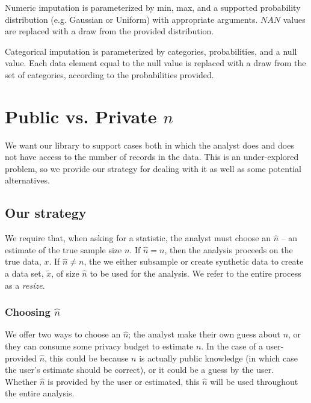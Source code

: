 \documentclass[11pt]{scrartcl} %
\begin{document}
Numeric imputation is parameterized by min, max, and a supported probability distribution (e.g. Gaussian or Uniform)
with appropriate arguments. $NAN$ values are replaced with a draw from the provided distribution. \newline

Categorical imputation is parameterized by categories, probabilities, and a null value.
Each data element equal to the null value is replaced with a draw from the set of categories,
according to the probabilities provided.

\section{Public vs. Private $n$}
We want our library to support cases both in which the analyst does and does not have access to
the number of records in the data. This is an under-explored problem, so we provide
our strategy for dealing with it as well as some potential alternatives.

\subsection{Our strategy}
We require that, when asking for a statistic, the analyst must choose an $\hat{n}$ -- an estimate
of the true sample size $n$. If $\hat{n} = n$, then the analysis proceeds on the
true data, $x$. If $\hat{n} \neq n$, the we either subsample or create synthetic data
to create a data set, $\tilde{x}$, of size $\hat{n}$ to be used for the analysis.
We refer to the entire process as a \emph{resize}.

\subsubsection{Choosing $\hat{n}$}
We offer two ways to choose an $\hat{n}$; the analyst make their own guess about $n$, or they can
consume some privacy budget to estimate $n$. In the case of a user-provided $\hat{n}$, this could be because
$n$ is actually public knowledge (in which case the user's estimate should be correct), or it could be
a guess by the user. Whether $\hat{n}$ is provided by the user or estimated, this $\hat{n}$ will be used throughout
the entire analysis. \newline
\end{document}
